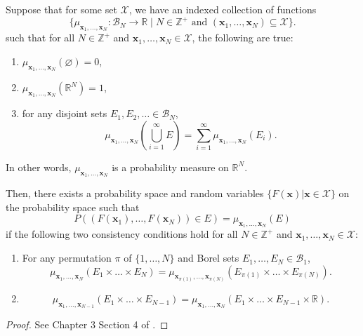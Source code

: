 \begin{theorem}\label{thm:kol-ext}
    Suppose that for some set $\mathcal{X}$, we have an indexed collection of functions
    \begin{equation*}
        \{ \mu_{\mathbf{x}_1, \dots, \mathbf{x}_N} : \mathcal{B}_{N} \to \mathbb{R} \;|\; N \in \mathbb{Z}^{+} \text{ and } (\mathbf{x}_1, \dots, \mathbf{x}_N) \subseteq \mathcal{X}\}.
    \end{equation*}
    such that for all $N \in \mathbb{Z}^{+}$ and $\mathbf{x}_1, \dots, \mathbf{x}_N \in \mathcal{X}$,
    the following are  true:
    \begin{enumerate}
        \item $\mu_{\mathbf{x}_1, \dots, \mathbf{x}_N}( \varnothing) = 0$,
        \item $\mu_{\mathbf{x}_1, \dots, \mathbf{x}_N}\left(\mathbb{R}^{N}\right) = 1$,
        \item for any disjoint sets $E_1, E_2, \dots \in \mathcal{B}_N$,
            \begin{equation*}
                \mu_{\mathbf{x}_1, \dots, \mathbf{x}_N}\left(\bigcup_{i = 1}^{\infty}
                E\right) = \sum_{i = 1}^{\infty}\mu_{\mathbf{x}_1, \dots, \mathbf{x}_N}(E_i).
            \end{equation*}
    \end{enumerate}
    In other words, $\mu_{\mathbf{x}_1, \dots, \mathbf{x}_N}$ is a probability measure on $\mathbb{R}^{N}$.

    Then, there exists a probability space and random variables $\{ F(\mathbf{x}) | \mathbf{x} \in \mathcal{X} \}$
    on the probability space such that
    \begin{equation*}
        P((F(\mathbf{x}_1), \dots, F(\mathbf{x}_N)) \in E) = \mu_{\mathbf{x}_1, \dots, \mathbf{x}_N}(E)
    \end{equation*}
    if the following two consistency conditions hold for all $N \in \mathbb{Z}^{+}$ and $\mathbf{x}_1, \dots, \mathbf{x}_N \in \mathcal{X}$:
    \begin{enumerate}
        \item For any permutation $\pi$ of $\{ 1, \dots, N \}$ and Borel sets $E_1, \dots, E_N \in \mathcal{B}_1$,
            \begin{equation*}
                \mu_{\mathbf{x}_1, \dots, \mathbf{x}_N}(E_1 \times \dots \times E_N)
                =\mu_{\mathbf{x}_{\pi(1)}, \dots, \mathbf{x}_{\pi(N)}}\left(E_{\pi(1)} \times \dots \times E_{\pi(N)}\right).
            \end{equation*}
        \item
            \begin{equation*}
                \mu_{\mathbf{x}_1, \dots, \mathbf{x}_{N - 1}}(E_1 \times \dots \times E_{N - 1})
                =
                \mu_{\mathbf{x}_1, \dots, \mathbf{x}_N}(E_1 \times \dots \times E_{N - 1} \times \mathbb{R}).
            \end{equation*}
    \end{enumerate}
\end{theorem}
\begin{proof}
    See Chapter 3 Section 4 of \cite{kolmogorov1933}.
\end{proof}

